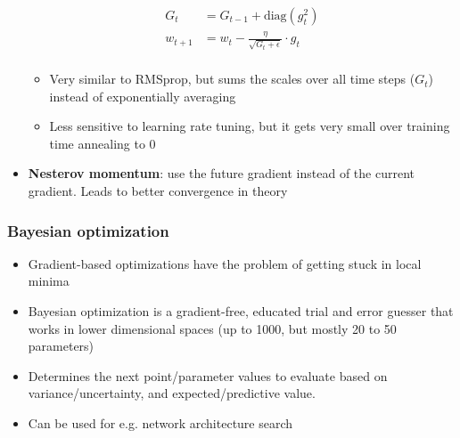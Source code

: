 \begin{itemize}
	\begin{equation*}
		\begin{split}
			G_t & = G_{t-1} + \text{diag}\left(g_t^2\right)\\
			w_{t+1} & = w_{t} - \frac{\eta}{\sqrt{G_t + \epsilon}}\cdot g_t\\
		\end{split}
	\end{equation*}
	\begin{itemize}
		\item Very similar to RMSprop, but sums the scales over all time steps ($G_t$) instead of exponentially averaging 
		\item Less sensitive to learning rate tuning, but it gets very small over training time annealing to 0
	\end{itemize} 
	\item \textbf{Nesterov momentum}: use the future gradient instead of the current gradient. Leads to better convergence in theory
\end{itemize}
\subsubsection{Bayesian optimization}
\begin{itemize}
	\item Gradient-based optimizations have the problem of getting stuck in local minima
	\item Bayesian optimization is a gradient-free, educated trial and error guesser that works in lower dimensional spaces (up to 1000, but mostly 20 to 50 parameters)
	\item Determines the next point/parameter values to evaluate based on variance/uncertainty, and expected/predictive value. 
	\item Can be used for e.g. network architecture search
\end{itemize}
